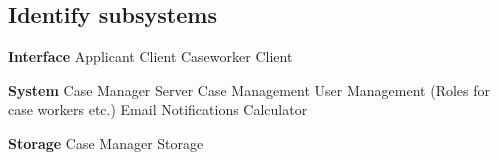 \subsection{Identify subsystems}

\textbf{Interface}
Applicant Client
Caseworker Client

\textbf{System}
Case Manager Server
Case Management
User Management (Roles for case workers etc.)
Email Notifications
Calculator

\textbf{Storage}
Case Manager Storage
